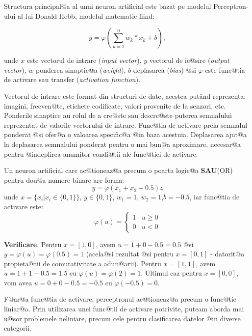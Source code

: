 Structura principal@a al unui neuron artificial este bazat pe modelul Perceptron-ului al lui Donald Hebb, modelul matematic fiind:

$$
	y = \varphi \left( \sum_{k=1}^{n} w_k * x_k + b \right),
$$

\indent unde $x$ este vectorul de intrare ({\sl input vector}), $y$ vectorul de ie@sire ({\sl output vector}), $w$ ponderea sinaptic@a ({\sl weight}), $b$ deplasarea ({\sl bias}) @si $\varphi$ este func@tia de activare sau transfer ({\sl activation function}).

Vectorul de intrare este format din structuri de date, acestea put\^ and reprezenta: imagini, frecven@te, etichete codificate, valori provenite de la senzori, etc. Ponderile sinaptice au rolul de a cre@ste sau descre@ste puterea semnalului reprezentat de valorile vectorului de intrare. Func@tia de activare preia semnalul ponderat @si ofer@a o valoarea specific@a @in baza acestuia. Deplasarea ajut@a la deplasarea semnalului ponderat pentru o mai bun@a aproximare, necesar@a pentru @indeplirea anumitor condi@tii ale func@tiei de activare.

\begin{exemplu}

	Un neuron artificial care ac@tioneaz@a precum o poarta logic@a {\bf SAU}(OR) pentru dou@a numere binare are forma:
$$
	y = \varphi ( x_1 + x_2 - 0.5 )z
$$
\noindent unde $x = \{ x_i | x_i \in \{0, 1\} \}$, $y \in \{0, 1\}$, $w_1 = 1$, $w_2 = 1$,$b = -0.5$, iar func@tia de activare este: 
$$
	\varphi ( u ) = \left\lbrace
		\begin{array}{lc}
			1 & u \geq 0 \\
			0 & u < 0
		\end{array}
	\right.
$$
\end{exemplu}

{\bf Verificare}. Pentru $x = [1, 0]$, avem $u = 1 + 0 - 0.5 = 0.5$ @si $y = \varphi(u) = \varphi(0.5) = 1$ (acela@si rezultat @si pentru $x = [0, 1]$ - datorit@a propieta@tii de comutativitate a adun@arii).
Pentru $x = [1, 1]$, avem $u = 1 + 1 - 0.5 = 1.5$ cu $\varphi (u) = \varphi ( 2 ) = 1$. Ultimul caz pentru $x = [0, 0]$, vom avea $u = 0 + 0 - 0.5 = -0.5$ cu $\varphi (-0.5) = 0$.

\begin{observatia}
	F@ar@a func@tia de activare, perceptronul ac@tioneaz@a precum o func@tie liniar@a. Prin utilizarea unei func@tii de activare potrivite, puteam aborda mai u@sor problemele neliniare, precum cele pentru clasificarea datelor @in diverse categorii.
\end{observatia}

